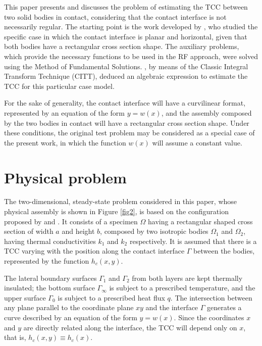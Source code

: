 \documentclass[12pt]{CHT-20}
\begin{document}
This paper presents and discusses the problem of estimating the TCC between two solid bodies in contact, considering that the contact interface is not necessarily regular. The starting point is the work developed by \cite{reciproc_3}, who studied the specific case in which the contact interface is planar and horizontal, given that both bodies have a rectangular cross section shape. The auxiliary problems, which provide the necessary functions to be used in the RF approach, were solved using the Method of Fundamental Solutions. \cite{artigo_padilha_3}, by means of the Classic Integral Transform Technique (CITT)\citep{livro_integral_transforms_cotta}, deduced an algebraic expression to estimate the TCC for this particular case model.

For the sake of generality, the contact interface will have a curvilinear format, represented by an equation of the form $y = w(x)$, and the assembly composed by the two bodies in contact will have a rectangular cross section shape. Under these conditions, the original test problem \citep{reciproc_3} may be considered as a special case of the present work, in which the function $w(x)$ will assume a constant value. 

\section*{Physical problem}

The two-dimensional, steady-state problem considered in this paper, whose physical assembly is shown in Figure \ref{fig2}, is based on the configuration proposed by \cite{reciproc_3} and \cite{artigo_abreu_3}. It consists of a specimen $\Omega$ having a rectangular shaped cross section of width $a$ and height $b$, composed by two isotropic bodies $\Omega_1$ and $\Omega_2$, having thermal conductivities $k_1$ and $k_2$ respectively. It is assumed that there is a TCC varying with the position along the contact interface $\Gamma$ between the bodies, represented by the function $h_c(x, y)$.

The lateral boundary surfaces $\Gamma_1$ and $\Gamma_2$ from both layers are kept thermally insulated; the bottom surface $\Gamma_\infty$ is subject to a prescribed temperature, and the upper surface $\Gamma_0$ is subject to a prescribed heat flux $q$. The intersection between any plane parallel to the coordinate plane $xy$ and the interface $\Gamma$ generates a curve described by an equation of the form $y = w(x)$. Since the coordinates $x$ and $y$ are directly related along the interface, the TCC will depend only on $x$, that is, $h_c(x, y) \equiv h_c(x)$.
\end{document}
